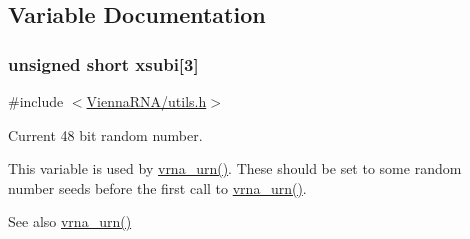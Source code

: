 \subsection{Variable Documentation}
\hypertarget{group__utils_gaf9a866c8417afda7368bbac939ab3c47}{}
\subsubsection[{xsubi}]{\setlength{\rightskip}{0pt plus 5cm}unsigned short xsubi\mbox{[}3\mbox{]}}\label{group__utils_gaf9a866c8417afda7368bbac939ab3c47}


{\ttfamily \#include $<$\hyperlink{utils_8h}{Vienna\+R\+N\+A/utils.\+h}$>$}



Current 48 bit random number. 

This variable is used by \hyperlink{group__utils_ga384e256ebb295d04a14426179db0dd6e}{vrna\+\_\+urn()}. These should be set to some random number seeds before the first call to \hyperlink{group__utils_ga384e256ebb295d04a14426179db0dd6e}{vrna\+\_\+urn()}.

\begin{DoxySeeAlso}{See also}
\hyperlink{group__utils_ga384e256ebb295d04a14426179db0dd6e}{vrna\+\_\+urn()} 
\end{DoxySeeAlso}

